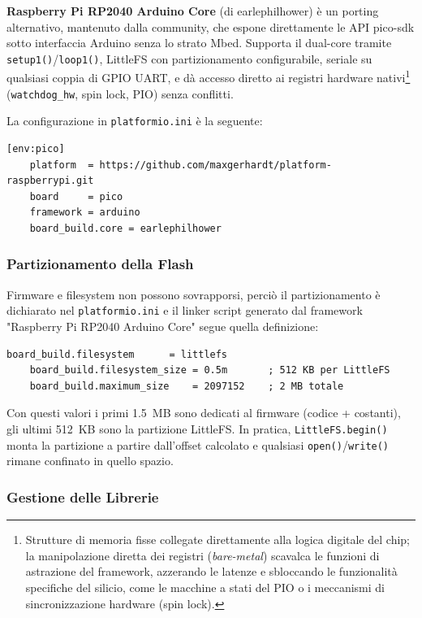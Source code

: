 \textbf{Raspberry Pi RP2040 Arduino Core} (di earlephilhower) è un porting alternativo, mantenuto dalla community, che espone direttamente le API pico-sdk sotto interfaccia Arduino senza lo strato Mbed. Supporta il dual-core tramite \texttt{setup1()}/\texttt{loop1()}, LittleFS con partizionamento configurabile, seriale su qualsiasi coppia di GPIO UART, e dà accesso diretto ai registri hardware nativi\footnote{Strutture di memoria fisse collegate direttamente alla logica digitale del chip; la manipolazione diretta dei registri (\textit{bare-metal}) scavalca le funzioni di astrazione del framework, azzerando le latenze e sbloccando le funzionalità specifiche del silicio, come le macchine a stati del PIO o i meccanismi di sincronizzazione hardware (spin lock).} (\texttt{watchdog\_hw}, spin lock, PIO) senza conflitti.

La configurazione in \texttt{platformio.ini} è la seguente:

\begin{lstlisting}[style=ini, caption={platformio.ini --- selezione framework e core}]
	[env:pico]
	platform  = https://github.com/maxgerhardt/platform-raspberrypi.git
	board     = pico
	framework = arduino
	board_build.core = earlephilhower
\end{lstlisting}

\subsubsection*{Partizionamento della Flash}
 
Firmware e filesystem non possono sovrapporsi, perciò il partizionamento è dichiarato nel \texttt{platformio.ini} e il linker script generato dal framework "Raspberry Pi RP2040 Arduino Core" segue quella definizione:

\begin{lstlisting}[style=ini, caption={platformio.ini --- layout flash}]
	board_build.filesystem      = littlefs
	board_build.filesystem_size = 0.5m       ; 512 KB per LittleFS
	board_build.maximum_size    = 2097152    ; 2 MB totale
\end{lstlisting}

Con questi valori i primi 1.5~MB sono dedicati al firmware (codice + costanti), gli ultimi 512~KB sono la partizione LittleFS. 
In pratica, \texttt{LittleFS.begin()} monta la partizione a partire dall'offset calcolato e qualsiasi \texttt{open()}/\texttt{write()} rimane confinato in quello spazio.

\subsubsection*{Gestione delle Librerie}

